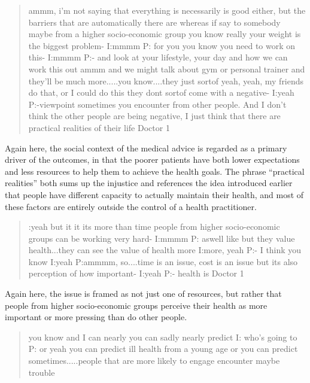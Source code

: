\begin{quotation}

ammm, i'm not saying that everything is necessarily is good either, but the barriers that are automatically there are whereas if say to somebody maybe from a higher socio-economic group you know really your weight is the biggest problem-
I:mmmm
P: for you you know you need to work on this-
I:mmmm
P:- and look at your lifestyle, your day and how we can work this out ammm and we might talk about gym or personal trainer and they'll be much more.....you know....they just sortof yeah, yeah, my friends do that, or I could do this they dont sortof come with a negative-
I:yeah
P:-viewpoint sometimes you encounter from other people. And I don't think the other people are being negative, I just think that there are practical realities of their life
Doctor 1
\end{quotation}

Again here, the social context of the medical advice is regarded as a primary driver of the outcomes, in that the poorer patients have both lower expectations and less resources to help them to achieve the health goals. The phrase ``practical realities'' both sums up the injustice and references the idea introduced earlier that people have different capacity to actually maintain their health, and most of these factors are entirely outside the control of a health practitioner. 

\begin{quotation}
  :yeah but it it its more than time people from higher socio-economic groups can be working very hard-
I:mmmm
P: aswell like but they value health...they can see the value of health more
I:more, yeah
P:- I think you know
I:yeah
P:ammmm, so....time is an issue, cost is an issue but its also perception of how important-
I:yeah
P:- health is
Doctor 1
\end{quotation}

Again here, the issue is framed as not just one of resources, but rather that people from higher socio-economic groups perceive their health as more important or more pressing than do other people. 


\begin{quotation}
  you know and I can nearly you can sadly nearly predict 
I: who's going to
P: or yeah you can predict ill health from a young age or you can predict sometimes.....people that are more likely to engage encounter maybe trouble

\end{quotation}

